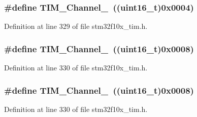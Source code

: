 \subsubsection[{\texorpdfstring{T\+I\+M\+\_\+\+Channel\+\_\+2}{TIM_Channel_2}}]{\setlength{\rightskip}{0pt plus 5cm}\#define T\+I\+M\+\_\+\+Channel\+\_~(({\bf uint16\+\_\+t})0x0004)}\hypertarget{group___t_i_m___channel_ga03d7da8269a87a560f68985b4bd80931}{}\label{group___t_i_m___channel_ga03d7da8269a87a560f68985b4bd80931}


Definition at line 329 of file stm32f10x\+\_\+tim.\+h.

\subsubsection[{\texorpdfstring{T\+I\+M\+\_\+\+Channel\+\_\+3}{TIM_Channel_3}}]{\setlength{\rightskip}{0pt plus 5cm}\#define T\+I\+M\+\_\+\+Channel\+\_~(({\bf uint16\+\_\+t})0x0008)}\hypertarget{group___t_i_m___channel_ga012711b19e8c91f6f352801a3dc0bcc9}{}\label{group___t_i_m___channel_ga012711b19e8c91f6f352801a3dc0bcc9}


Definition at line 330 of file stm32f10x\+\_\+tim.\+h.

\subsubsection[{\texorpdfstring{T\+I\+M\+\_\+\+Channel\+\_\+3}{TIM_Channel_3}}]{\setlength{\rightskip}{0pt plus 5cm}\#define T\+I\+M\+\_\+\+Channel\+\_~(({\bf uint16\+\_\+t})0x0008)}\hypertarget{group___t_i_m___channel_ga012711b19e8c91f6f352801a3dc0bcc9}{}\label{group___t_i_m___channel_ga012711b19e8c91f6f352801a3dc0bcc9}


Definition at line 330 of file stm32f10x\+\_\+tim.\+h.

